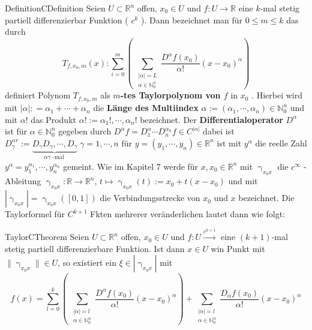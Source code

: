 \begin{ibox}[]{Definition}{CDefinition}
    Seien $ U \subset \mathbb{R}^n  $ offen, $ x_0 \in U $ und $ f: U \to \mathbb{R}  $ eine $ k $-mal stetig partiell differenzierbar
	Funktion ( $ c^{k} $ ). Dann bezeichnet man für $ 0 \leq  m \leq k $ das durch
	$$ T_{f, x_0, m} \left(x\right) : \sum_{i=0}^{m} \left( \, \sum_{ \substack{ |\alpha| = L \\ \alpha \in \mathbb{N}_{0}^{n} }}
	\frac{D^{\alpha }f \left(x_0\right) }{\alpha !} \left( x - x_0 \right) ^{\alpha }\right) $$ 
		definiert Polynom $ T_{f,x_0,m} $ als \textbf{ $ m $-tes Taylorpolynom von $ f \text{ in } x_0 $ }. Hierbei wird mit 
	$ |\alpha| : = \alpha_1 +  \cdots + \alpha_n $ die \textbf{Länge des Multiindex} $ \alpha := \left( \alpha_1, \cdots,  \alpha_{n} \right) \in \mathbb{N}_{0}^{n} $ und mit $ \alpha ! $ das Produkt $ \alpha ! := \alpha_1 ! , \cdots,  \alpha_{n} ! $ bezeichnet. Der 
	\textbf{Differentialoperator} $ D^{\alpha } $ ist für $ \alpha  \in \mathbb{N}_{0}^{n} $ gegeben durch $ D^{\alpha }f = 
	D_1^{\alpha } \cdots  D_n^{\alpha_n} f \in C^{|\alpha |}$ dabei ist $ D_{\gamma }^{\alpha r} := \underbrace{ D_{\gamma } 
	D_{\gamma }, \cdots,  D_{\gamma }}_{\alpha \gamma \text{ -mal } } \; \gamma = 1, \cdots,  n \text{ für } y = \left( y_1
, \cdots,  y_n\right) \in \mathbb{R}^n $	ist mit  $ y^{\alpha } $ die reelle Zahl $ y^{\alpha } = y_1^{\alpha_1},
\cdots,  y_n^{\alpha_n} $  gemeint. Wie im Kapitel 7 werde für $ x,x_0 \in \mathbb{R}^n  $ mit $ \upgamma_{x_0x} $ die $ c^{ \infty } $
-Ableitung $ \upgamma_{x_0x}: \mathbb{R}  \to \mathbb{R}^n  $, $ t \mapsto \upgamma_{x_0x} \left(t\right) := x_0 + t(x-x_0)$ und mit
$  \left| \upgamma_{x_0x} \right| = \upgamma_{x_0x} \left( \left[ 0,1 \right]  \right)  $ die Verbindungsstrecke von $ x_0 \text{ und }
x $ bezeichnet. Die Taylorformel für $ C^{k+1} $ Fkten mehrerer veränderlichen lautet dann wie folgt:
\end{ibox}
\begin{ibox}[40]{Taylor}{CTheorem}
	Seien $ U \subset \mathbb{R}^n  $ offen, $ x_0 \in U $ und $ f:U \xrightarrow{c^{k+1}}$ eine $ (k+1) $-mal stetig 
	partiell differenzierbare Funktion. Ist dann $ x \in  U $ win Punkt mit $ \| \upgamma_{x_0x} \| \in U $, so existiert ein 
	$ \xi \in \left| \upgamma_{x_0x} \right|  $ mit 
	$$ f \left(x\right) = \sum_{l=0}^{k} \left( \, \sum_{ \substack{ |\alpha | = l \\ \alpha \in \mathbb{N}_{0}^{n} }} 
	\frac{D^{\alpha }f \left(x_0\right) }{\alpha !} \left( x - x_0 \right) ^{\alpha } \right) + \sum_{ \substack{ |\alpha | = l \\ 
\alpha  \in  \mathbb{N}_{0}^{n}}} \frac{D_{\alpha }f \left(x_0\right) }{\alpha !} \left( x-x_0 \right) ^{\alpha } $$
\end{ibox}
 
